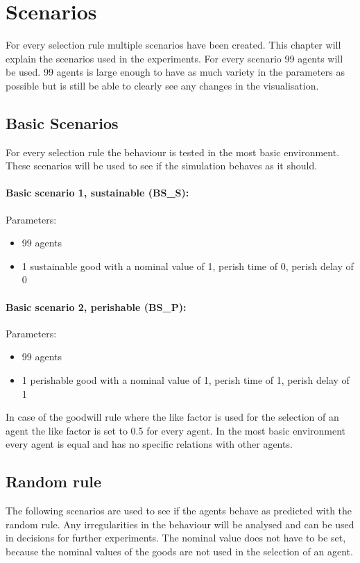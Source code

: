 \documentclass[twoside,openright]{uva-bachelor-thesis}
\begin{document}
\chapter{Scenarios}
For every selection rule multiple scenarios have been created. This chapter will explain the scenarios used in the experiments. For every scenario 99 agents will be used. 99 agents is large enough to have as much variety in the parameters as possible but is still be able to clearly see any changes in the visualisation. 

\section{Basic Scenarios}
For every selection rule the behaviour is tested in the most basic environment. These scenarios will be used to see if the simulation behaves as it should.
\subsubsection{Basic scenario 1, sustainable (BS\_S):}
Parameters:
\begin{itemize}
\item 99 agents
\item 1 sustainable good with a nominal value of 1, perish time of 0, perish delay of 0
\end{itemize}
\subsubsection{Basic scenario 2, perishable (BS\_P):}
Parameters:
\begin{itemize}
\item 99 agents
\item 1 perishable good with a nominal value of 1, perish time of 1, perish delay of 1
\end{itemize}
In case of the goodwill rule where the like factor is used for the selection of an agent the like factor is set to 0.5 for every agent. In the most basic environment every agent is equal and has no specific relations with other agents.

\section{Random rule}
The following scenarios are used to see if the agents behave as predicted with the random rule. Any irregularities in the behaviour will be analysed and can be used in decisions for further experiments. The nominal value does not have to be set, because the nominal values of the goods are not used in the selection of an agent.
\end{document}
